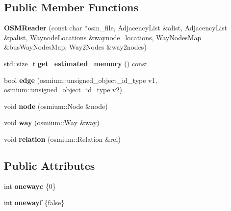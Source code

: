 \subsection*{Public Member Functions}
\begin{DoxyCompactItemize}
\item 
\hypertarget{classjustine_1_1robocar_1_1OSMReader_aec040325b35f2d2d7da1f4fe374fa123}{{\bfseries O\-S\-M\-Reader} (const char $\ast$osm\-\_\-file, Adjacency\-List \&alist, Adjacency\-List \&palist, Waynode\-Locations \&waynode\-\_\-locations, Way\-Nodes\-Map \&bus\-Way\-Nodes\-Map, Way2\-Nodes \&way2nodes)}\label{classjustine_1_1robocar_1_1OSMReader_aec040325b35f2d2d7da1f4fe374fa123}

\item 
\hypertarget{classjustine_1_1robocar_1_1OSMReader_a299192923af868d17a9e789f9a393fc9}{std\-::size\-\_\-t {\bfseries get\-\_\-estimated\-\_\-memory} () const }\label{classjustine_1_1robocar_1_1OSMReader_a299192923af868d17a9e789f9a393fc9}

\item 
\hypertarget{classjustine_1_1robocar_1_1OSMReader_afbb52b817781b4f700db6946ebdffa4d}{bool {\bfseries edge} (osmium\-::unsigned\-\_\-object\-\_\-id\-\_\-type v1, osmium\-::unsigned\-\_\-object\-\_\-id\-\_\-type v2)}\label{classjustine_1_1robocar_1_1OSMReader_afbb52b817781b4f700db6946ebdffa4d}

\item 
\hypertarget{classjustine_1_1robocar_1_1OSMReader_a09b77083902c6b8e65783ff44f1f16b5}{void {\bfseries node} (osmium\-::\-Node \&node)}\label{classjustine_1_1robocar_1_1OSMReader_a09b77083902c6b8e65783ff44f1f16b5}

\item 
\hypertarget{classjustine_1_1robocar_1_1OSMReader_a370575ff1c26042b43a69d8a80a4d4a1}{void {\bfseries way} (osmium\-::\-Way \&way)}\label{classjustine_1_1robocar_1_1OSMReader_a370575ff1c26042b43a69d8a80a4d4a1}

\item 
\hypertarget{classjustine_1_1robocar_1_1OSMReader_a7c9c0aae3bc3bcfc9d83ddbc1c13ef6c}{void {\bfseries relation} (osmium\-::\-Relation \&rel)}\label{classjustine_1_1robocar_1_1OSMReader_a7c9c0aae3bc3bcfc9d83ddbc1c13ef6c}

\end{DoxyCompactItemize}
\subsection*{Public Attributes}
\begin{DoxyCompactItemize}
\item 
\hypertarget{classjustine_1_1robocar_1_1OSMReader_a634019bf205c563f37a534f8a0875a63}{int {\bfseries onewayc} \{0\}}\label{classjustine_1_1robocar_1_1OSMReader_a634019bf205c563f37a534f8a0875a63}

\item 
\hypertarget{classjustine_1_1robocar_1_1OSMReader_a1bf3e852c9e168b69c6e06492883d6b6}{int {\bfseries onewayf} \{false\}}\label{classjustine_1_1robocar_1_1OSMReader_a1bf3e852c9e168b69c6e06492883d6b6}

\end{DoxyCompactItemize}
